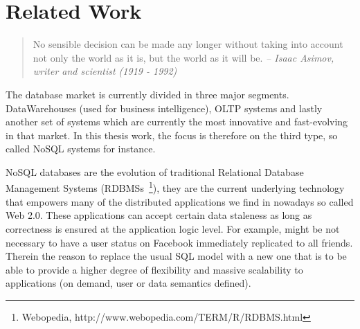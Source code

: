 %
%



\chapter{Related Work}

\label{ch:relatedwork}

\begin{quotation}
No sensible decision can be made any longer without taking into account not only the world as it is, but the world as it will be.
{\small\it -- Isaac Asimov, writer and scientist (1919 - 1992)}
\end{quotation}

The database market is currently divided in three major segments. DataWarehouses (used for business intelligence), OLTP systems and lastly another set of systems which are currently the most innovative and fast-evolving in that market. In this thesis work, the focus is therefore on the third type, so called NoSQL systems for instance.

NoSQL databases are the evolution of traditional Relational Database Management Systems (RDBMSs~\footnote{Webopedia, http://www.webopedia.com/TERM/R/RDBMS.html}), they are the current underlying technology that empowers many of the distributed applications we find in nowadays so called Web 2.0. These applications can accept certain data staleness as long as correctness is ensured at the application logic level. For example, might be not necessary to have a user status on Facebook immediately replicated to all friends. Therein the reason to replace the usual SQL model with a new one that is to be able to provide a higher degree of flexibility and massive scalability to applications (on demand, user or data semantics defined).

